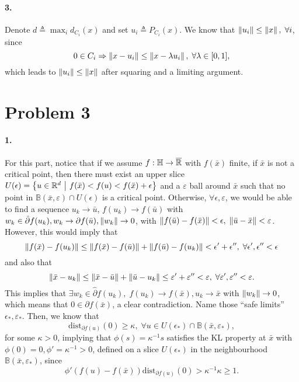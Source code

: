 \documentclass[10pt]{article}
\begin{document}
\paragraph{3.}
Denote $d \triangleq \max_i d_{C_i}(x)$ and set $u_i \triangleq P_{C_i}(x)$.
We know that $\left \| u_i \right \| \leq \left \| x \right \|, \; \forall i$, since
\[
    0 \in C_i \Rightarrow
    \left \| x - u_i \right \| \leq \left \| x - \lambda u_i \right \|, \; \forall \lambda \in [0, 1],
\]
which leads to $\left \| u_i \right \| \leq \left \| x \right \|$ after squaring and a limiting
argument.

\section*{Problem 3}
\paragraph{1.}
For this part, notice that if we assume $f: \mathbb{H} \to \overline{\mathbb{R}}$ with
$f(\bar{x})$ finite, if $\bar{x}$ is not a critical point, then there must
exist an upper slice $U(\epsilon) = \left\{ u \in \mathbb{R}^d \ \middle| \  f(\bar{x}) < f(u) <
f(\bar{x}) + \epsilon \right\}$ and a $\varepsilon$ ball around $\bar{x}$ such that no
point in $\mathbb{B}(\bar{x}, \varepsilon) \cap U(\epsilon)$ is a critical
point. Otherwise, $\forall \epsilon, \varepsilon$, we would be able to find a
sequence $u_k \to \bar{u}$, $f(u_k) \to f(\bar{u})$
with $w_k \in \hat{\partial} f(u_k), w_k \to \partial f(\bar{u}), \left \| w_k \right \|
\to 0$, with $\left \| f(\bar{u}) - f(\bar{x}) \right \| < \epsilon, \; \left \| \bar{u} -
\bar{x} \right \| < \varepsilon$. However, this would imply that
\[
    \left \| f(\bar{x}) - f(u_k) \right \| \leq \left \| f(\bar{x}) - f(\bar{u}) \right \|
    + \left \| f(\bar{u}) - f(u_k) \right \| < \epsilon' + \epsilon'', \; \forall
    \epsilon', \epsilon'' < \epsilon
\]
and also that
\[
    \left \| \bar{x} - u_k \right \| \leq \left \| \bar{x} - \bar{u} \right \| + \left \| \bar{u}- u_k \right \|
    \leq \varepsilon' + \varepsilon'' < \varepsilon, \; \forall
    \varepsilon', \varepsilon'' < \varepsilon.
\]
This implies that $\exists w_k \in \hat{\partial} f(u_k), \; f(u_k) \to
f(\bar{x}), u_k \to \bar{x}$ with $\left \| w_k \right \| \to 0$, which means that $0 \in
\partial f(\bar{x})$, a clear contradiction.
Name those ``safe limits'' $\epsilon_*, \varepsilon_*$. Then, we know that
\[
    \mathrm{dist}_{\partial f(u)}(0) \geq \kappa, \; \forall u
    \in U(\epsilon_*) \cap \mathbb{B}(\bar{x}, \varepsilon_*),
\]
for some $\kappa > 0$, implying that $\phi(s) = \kappa^{-1} s$ satisfies the
KL property at $\bar{x}$ with $\phi(0) = 0, \phi' = \kappa^{-1} > 0$, defined
on a slice $U(\epsilon_*)$ in the neighbourhood $\mathbb{B}(\bar{x},
\varepsilon_*)$, since
\[
    \phi'(f(u) - f(\bar{x})) \mathrm{dist}_{\partial f(u)}(0) >
    \kappa^{-1} \kappa \geq 1.
\]
\end{document}
